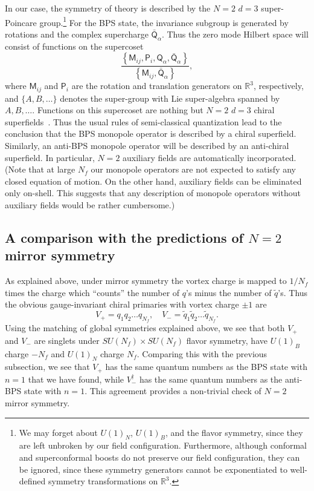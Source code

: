 \documentclass[a4paper,12pt, amsfonts, amssymb]{article}
\newcommand{\RR}{{\mathbb R}}
\newcommand{\tq}{{\tilde q}}
\newcommand{\Q}{{\mathsf Q}}
\renewcommand{\P}{{\mathsf P}}
\newcommand{\M}{{\mathsf M}}
\begin{document}
In our case, the symmetry of theory is described by the $N=2$ $d=3$ super-Poincare group.\footnote{We may forget about $U(1)_N$, $U(1)_B$, and
the flavor symmetry, since they are left unbroken by our field configuration.
Furthermore, although conformal and superconformal boosts do not preserve 
our field configuration, they can be ignored, since these symmetry generators cannot be exponentiated to well-defined symmetry transformations on $\RR^3.$}
For the BPS state, the invariance subgroup is generated by rotations
and the complex supercharge ${\bar\Q}_\alpha$.
Thus the zero mode Hilbert space will consist of functions on the supercoset
$$
\frac{\left\{\M_{ij}, \P_i, \Q_\alpha, 
{\bar\Q}_\alpha\right\}}{\left\{\M_{ij}, {\bar\Q}_\alpha\right\}},
$$
where $\M_{ij}$ and $\P_i$ are the rotation and translation generators on $\RR^3$, respectively, and $\{ A,B,\ldots\}$ denotes the super-group with Lie
super-algebra spanned by $A,B,\ldots.$
Functions on this supercoset are nothing but $N=2$ $d=3$ chiral
superfields~\cite{HS}. Thus the usual rules of semi-classical 
quantization lead to the conclusion that the BPS monopole operator is 
described by a chiral superfield. Similarly, an anti-BPS monopole operator 
will be described by an anti-chiral superfield. In particular, $N=2$ 
auxiliary fields are automatically incorporated. 
(Note that at large $N_f$ our monopole operators are not expected to satisfy 
any closed equation of motion. On the other hand, auxiliary fields can
be eliminated only on-shell. This suggests that any description of
monopole operators without auxiliary fields would be rather cumbersome.) 


\subsection{A comparison with the predictions of $N=2$ mirror symmetry}

As explained above, under mirror symmetry the vortex charge is mapped to 
$1/N_f$ times the charge which ``counts'' the number of $q$'s minus the 
number of $\tq$'s. Thus the obvious gauge-invariant chiral primaries with
vortex charge $\pm 1$ are
$$
V_+=q_1 q_2\ldots q_{N_f},\quad V_-=\tq_1 \tq_2\ldots \tq_{N_f}.
$$
Using the matching of global symmetries explained above, we see that both
$V_+$ and $V_-$ are singlets under $SU(N_f)\times SU(N_f)$ flavor symmetry, have $U(1)_B$ charge $-N_f$ and $U(1)_N$ charge $N_f$. 
Comparing this with the previous subsection, we see that $V_+$ has
the same quantum numbers as the BPS state
with $n=1$ that we have found, while $V_-^\dagger$ has the same quantum 
numbers as the anti-BPS state with $n=1$.
This agreement provides a non-trivial check of $N=2$ mirror symmetry.
\end{document}
